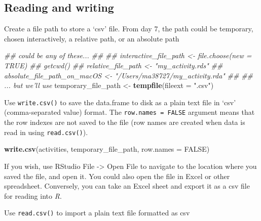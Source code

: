 \documentclass[]{book}
\newenvironment{Shaded}{\begin{snugshade}}{\end{snugshade}}
\newcommand{\CommentTok}[1]{\textcolor[rgb]{0.56,0.35,0.01}{\textit{#1}}}
\newcommand{\DataTypeTok}[1]{\textcolor[rgb]{0.13,0.29,0.53}{#1}}
\newcommand{\KeywordTok}[1]{\textcolor[rgb]{0.13,0.29,0.53}{\textbf{#1}}}
\newcommand{\NormalTok}[1]{#1}
\newcommand{\OtherTok}[1]{\textcolor[rgb]{0.56,0.35,0.01}{#1}}
\newcommand{\StringTok}[1]{\textcolor[rgb]{0.31,0.60,0.02}{#1}}
\begin{document}
\hypertarget{reading-and-writing}{%
\subsection*{Reading and writing}\label{reading-and-writing}}

Create a file path to store a `csv' file. From day 7, the path could be temporary, chosen interactively, a relative path, or an absolute path

\begin{Shaded}
\begin{Highlighting}[]
\CommentTok{## could be any of these...}
\CommentTok{##}
\CommentTok{## interactive_file_path <- file.choose(new = TRUE)}
\CommentTok{## getcwd()}
\CommentTok{## relative_file_path <- "my_activity.rds"}
\CommentTok{## absolute_file_path_on_macOS <- "/Users/ma38727/my_activity.rda"}
\CommentTok{##}
\CommentTok{## ... but we'll use}
\NormalTok{temporary_file_path <-}\StringTok{ }\KeywordTok{tempfile}\NormalTok{(}\DataTypeTok{fileext =} \StringTok{".csv"}\NormalTok{)}
\end{Highlighting}
\end{Shaded}

Use \texttt{write.csv()} to save the data.frame to disk as a plain text file in `csv' (comma-separated value) format. The \texttt{row.names\ =\ FALSE} argument means that the row indexes are not saved to the file (row names are created when data is read in using \texttt{read.csv()}).

\begin{Shaded}
\begin{Highlighting}[]
\KeywordTok{write.csv}\NormalTok{(activities, temporary_file_path, }\DataTypeTok{row.names =} \OtherTok{FALSE}\NormalTok{)}
\end{Highlighting}
\end{Shaded}

If you wish, use RStudio File -\textgreater{} Open File to navigate to the location where you saved the file, and open it. You could also open the file in Excel or other spreadsheet. Conversely, you can take an Excel sheet and export it as a csv file for reading into \emph{R}.

Use \texttt{read.csv()} to import a plain text file formatted as csv
\end{document}
